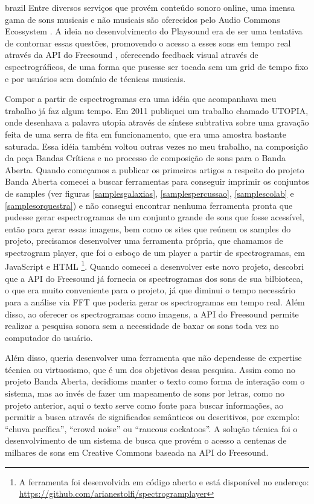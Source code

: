\begin{otherlanguage*}{brazil}
Entre diversos serviços que provém conteúdo sonoro online, uma imensa gama de sons musicais e não musicais são oferecidos pelo Audio Commons Ecossystem \cite{Font2015}. A ideia no desenvolvimento do Playsound era de ser uma tentativa de contornar essas questões, promovendo o acesso a esses sons em tempo real através da API do Freesound \cite{Akkermans2011}, oferecendo feedback visual através de espectrográficos, de uma forma que pusesse ser tocada sem um grid de tempo fixo e por usuários sem domínio de técnicas musicais.

Compor a partir de espectrogramas era uma idéia que acompanhava meu trabalho já faz algum tempo. Em 2011 publiquei um trabalho chamado UTOPIA, onde desenhava a palavra utopia através de síntese subtrativa sobre uma gravação feita de uma serra de fita em funcionamento, que era uma amostra bastante saturada. Essa idéia também voltou outras vezes no meu trabalho, na composição da peça Bandas Críticas e no processo de composição de sons para o Banda Aberta. Quando começamos a publicar os primeiros artigos a respeito do projeto Banda Aberta comecei a buscar ferramentas para conseguir imprimir os conjuntos de samples (ver figuras \ref{samplesgalaxias}, \ref{samplespercussao}, \ref{samplescolab} e \ref{samplesorquestra}) e não consegui encontrar nenhuma ferramenta pronta que pudesse gerar espectrogramas de um conjunto grande de sons que fosse acessível, então para gerar essas imagens, bem como os sites que reúnem os samples do projeto, precisamos desenvolver uma ferramenta própria, que chamamos de spectrogram player, que foi o esboço de um player a partir de spectrogramas, em JavaScript e HTML \footnote{A ferramenta foi desenvolvida em código aberto e está disponível no endereço: \url{https://github.com/arianestolfi/spectrogramplayer}}. Quando comecei a desenvolver este novo projeto, descobri que a API do Freesound já fornecia os spectrogramas dos sons de sua bilbioteca, o que era muito conveniente para o projeto, já que diminui o tempo necessário para a análise via FFT que poderia gerar os spectrogramas em tempo real. Além disso, ao oferecer os spectrogramas como imagens, a API do Freesound permite realizar a pesquisa sonora sem a necessidade de baxar os sons toda vez no computador do usuário.

Além disso, queria desenvolver uma ferramenta que não dependesse de expertise técnica ou virtuosismo, que é um dos objetivos dessa pesquisa. Assim como no projeto Banda Aberta, decidioms manter o texto como forma de interação com o sistema, mas ao invés de fazer um mapeamento de sons por letras, como no projeto anterior, aqui o texto serve como fonte para buscar informações, ao permitir a busca através de significados semânticos ou descritivos, por exemplo: ``chuva pacífica'', ``crowd noise'' ou ``raucous cockatoos''. A solução técnica foi o desenvolvimento de um sistema de busca que provém o acesso a centenas de milhares de sons em Creative Commons baseada na API do Freesound.


\end{otherlanguage*}
